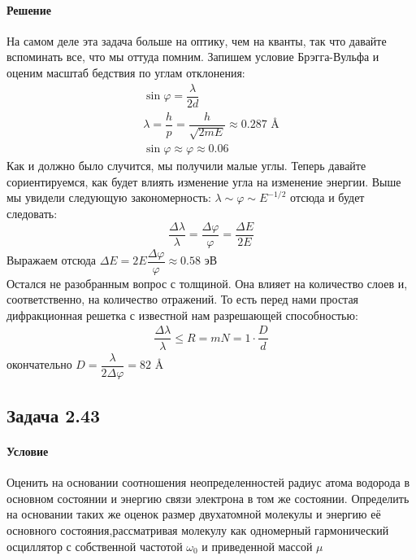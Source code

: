 \documentclass[12pt]{article}
\begin{document}
\paragraph{Решение}
На самом деле эта задача больше на оптику, чем на кванты, так что давайте вспоминать все, что мы оттуда помним. Запишем условие Брэгга-Вульфа и оценим масштаб бедствия по углам отклонения:
\begin{gather*}
    \sin{\varphi} = \dfrac{\lambda}{2d}\\
    \lambda = \dfrac{h}{p} = \dfrac{h}{\sqrt{2mE}} \approx 0.287 \text{ \AA}\\
    \sin{\varphi} \approx \varphi \approx 0.06
\end{gather*}
Как и должно было случится, мы получили малые углы. Теперь давайте сориентируемся, как будет влиять изменение угла на изменение энергии. Выше мы увидели следующую закономерность: $\lambda \sim \varphi  \sim E^{-1/2} $ отсюда и будет следовать:
\begin{equation*}
    \dfrac{\Delta \lambda}{\lambda} = \dfrac{\Delta \varphi}{\varphi} = \dfrac{\Delta E}{2E}
\end{equation*}
Выражаем отсюда $\Delta E = 2E \dfrac{\Delta \varphi}{\varphi} \approx 0.58$ эВ\\
Остался не разобранным вопрос с толщиной. Она влияет на количество слоев и, соответственно, на количество отражений. То есть перед нами простая дифракционная решетка с известной нам разрешающей способностью:
\begin{gather*}
    \dfrac{\Delta \lambda}{\lambda} \le R = mN = 1\cdot \dfrac{D}{d}
\end{gather*}
окончательно $D = \dfrac{\lambda}{2\Delta \varphi} = 82 \text{ \AA}$

\subsection{Задача 2.43}
\label{task_2.43}
\paragraph{Условие} Оценить на основании соотношения неопределенностей радиус атома водорода в основном состоянии и энергию связи электрона в том же состоянии. Определить на основании таких же оценок размер двухатомной молекулы и энергию её основного состояния,рассматривая молекулу как одномерный гармонический осциллятор с собственной частотой $\omega_0$ и приведенной массой $\mu$
\end{document}
